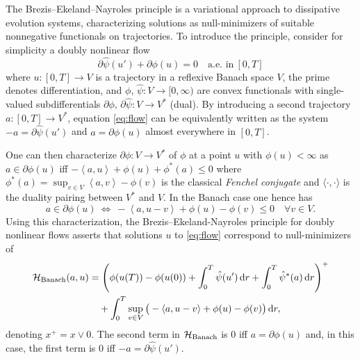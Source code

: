 \documentclass[reqno]{amsart}
\newcommand{\dr}{{\rm d} r}
\newcommand{\lan}{\left\langle}
\newcommand{\ran}{\right\rangle}
\newcommand{\HH}{{\mathcal H}}
\begin{document}
The Brezis--Ekeland--Nayroles principle \cite{Brezis-Ekeland76b,Brezis-Ekeland76, Nayroles76, Nayroles76b}  is a variational
approach to dissipative evolution systems, characterizing solutions as null-minimizers of suitable
nonnegative functionals on trajectories. To introduce the principle, consider for simplicity a doubly nonlinear flow
\begin{equation} \partial \hat \psi( u' ) + \partial \phi(u) = 0 \quad \text{a.e. in} \
[0,T]\label{eq:flow}
\end{equation}
where $u:[0,T]\to V$ is a trajectory in a reflexive Banach space $V$,
the prime denotes  differentiation,  and $\phi, \,\hat \psi: V \to
[0,\infty)$ are convex functionals with single-valued subdifferentials
$\partial \phi, \, \partial \hat \psi:V \to V^*$ (dual).   By introducing a second
trajectory $a:[0,T] \to V^*$, equation
\eqref{eq:flow} can be equivalently written as the system  $-a =
\partial \hat\psi(u')$ and $a =\partial
\phi(u) $ almost everywhere in $[0,T]$.

One can then characterize $\partial \phi: V \to
V^*$ of $\phi$ at a point $u $ with
                                $\phi(u)<\infty$ as
$a \in \partial \phi(u) $ iff $-\lan a , u
\ran + \phi(u) + \phi^*(a)\leq 0$
where $ \phi^*(a) = \sup_{v\in V}\lan a, v \ran -\phi(v)$
is the classical {\it Fenchel conjugate} and $\langle\cdot,\cdot\rangle$ is the duality pairing between
$V^*$ and $V$. In the Banach case one hence
has
\begin{equation}\label{eq:Banach_Fenchel_charac}
    a \in \partial \phi(u)  \ \Leftrightarrow \ -\lan a , u-v
\ran + \phi(u) -\phi(v)\leq 0 \quad \forall v \in V.
\end{equation}
Using this characterization, the Brezis--Ekeland-Nayroles principle for doubly nonlinear flows
\cite[Thm.~1.2]{be} asserts that solutions $u$ to \eqref{eq:flow} correspond
to  null-minimizers  of
\begin{align*}
    \HH_{\rm Banach}(a,u) &=
       \left(\phi(u(T))-\phi(u(0)) +\int_0^T \hat \psi( u') \, \dr +
                             \int_0^T  \hat \psi^*(a)\, \dr \right)^+ \\
  &\quad  +  \int_0^T \sup_{v\in V}\big( - 
                            \langle a,u-v \rangle +
    \phi(u) -\phi(v)\big)\, \dr, 
\end{align*}
denoting $x^+ =x\vee 0$. The  second term in $\HH_{\rm Banach}$ is $0$ iff $a =\partial
\phi(u)$ and, in this case, the first term is $0$ iff   $-a =
\partial \hat\psi(u')$. 
\end{document}
